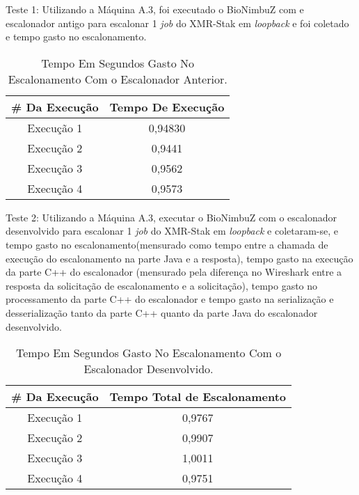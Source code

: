 Teste 1: Utilizando a Máquina A.3, foi executado o BioNimbuZ com e escalonador antigo para escalonar 1 \textit{job} do XMR-Stak em \textit{loopback} e foi coletado e tempo gasto no escalonamento.

\begin {table}[H]
\begin{center}
	\begin{tabular}{ |c|c| } 
		\hline
		\#  Da Execução & Tempo De Execução \\ 
		\hline
		Execução 1 & 0,94830 \\ 
		\hline
		Execução 2 & 0,9441 \\ 
		\hline
		Execução 3 & 0,9562 \\ 
		\hline
		Execução 4 & 0,9573 \\ 
		\hline
	\end{tabular}
	\caption {Tempo Em Segundos Gasto No Escalonamento Com o Escalonador Anterior.} \label{TabelaTempoEscalonadorAntigo} 
\end{center}
\end {table}

Teste 2: Utilizando a Máquina A.3, executar o BioNimbuZ com o escalonador desenvolvido para escalonar 1 \textit{job} do XMR-Stak em \textit{loopback} e coletaram-se, e tempo gasto no escalonamento(mensurado como tempo entre a chamada de execução do escalonamento na parte Java e a resposta), tempo gasto na execução da parte C++ do escalonador (mensurado pela diferença no Wireshark entre a resposta da solicitação de escalonamento e a solicitação), tempo gasto no processamento da parte C++ do escalonador e tempo gasto na serialização e desserialização tanto da parte C++ quanto da parte Java do escalonador desenvolvido.

\begin {table}[H]
\begin{center}
	\begin{tabular}{ |c|c| } 
		\hline
		\#  Da Execução & Tempo Total de Escalonamento \\ 
		\hline
		Execução 1 & 0,9767 \\ 
		\hline
		Execução 2 & 0,9907 \\ 
		\hline
		Execução 3 & 1,0011 \\ 
		\hline
		Execução 4 & 0,9751 \\ 
		\hline
	\end{tabular}
	\caption {Tempo Em Segundos Gasto No Escalonamento Com o Escalonador Desenvolvido.} \label{TabelaTempoEscalonadorNovo} 
\end{center}
\end {table}


